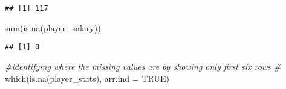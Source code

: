 \documentclass[
]{article}
\newenvironment{Shaded}{\begin{snugshade}}{\end{snugshade}}
\newcommand{\AttributeTok}[1]{\textcolor[rgb]{0.77,0.63,0.00}{#1}}
\newcommand{\CommentTok}[1]{\textcolor[rgb]{0.56,0.35,0.01}{\textit{#1}}}
\newcommand{\ConstantTok}[1]{\textcolor[rgb]{0.00,0.00,0.00}{#1}}
\newcommand{\FunctionTok}[1]{\textcolor[rgb]{0.00,0.00,0.00}{#1}}
\newcommand{\NormalTok}[1]{#1}
\begin{document}
\begin{verbatim}
## [1] 117
\end{verbatim}

\begin{Shaded}
\begin{Highlighting}[]
\FunctionTok{sum}\NormalTok{(}\FunctionTok{is.na}\NormalTok{(player\_salary))}
\end{Highlighting}
\end{Shaded}

\begin{verbatim}
## [1] 0
\end{verbatim}

\begin{Shaded}
\begin{Highlighting}[]
\CommentTok{\#identifying where the missing values are by showing only first six rows \#}
\FunctionTok{which}\NormalTok{(}\FunctionTok{is.na}\NormalTok{(player\_stats), }\AttributeTok{arr.ind =} \ConstantTok{TRUE}\NormalTok{)}
\end{Highlighting}
\end{Shaded}
\end{document}
